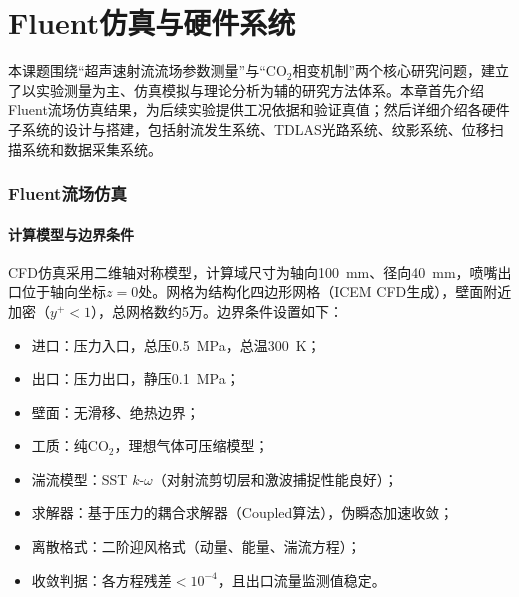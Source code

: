 ﻿\chapter{Fluent仿真与硬件系统}
	本课题围绕“超声速射流流场参数测量”与“CO$_2$相变机制”两个核心研究问题，建立了以实验测量为主、仿真模拟与理论分析为辅的研究方法体系。本章首先介绍Fluent流场仿真结果，为后续实验提供工况依据和验证真值；然后详细介绍各硬件子系统的设计与搭建，包括射流发生系统、TDLAS光路系统、纹影系统、位移扫描系统和数据采集系统。
	\subsection{Fluent流场仿真}
	\subsubsection{计算模型与边界条件}
	CFD仿真采用二维轴对称模型，计算域尺寸为轴向100~mm、径向40~mm，喷嘴出口位于轴向坐标$z=0$处。网格为结构化四边形网格（ICEM CFD生成），壁面附近加密（$y^+<1$），总网格数约5万。边界条件设置如下：
	\begin{itemize}
		\item 进口：压力入口，总压0.5~MPa，总温300~K；
		\item 出口：压力出口，静压0.1~MPa；
		\item 壁面：无滑移、绝热边界；
		\item 工质：纯CO$_2$，理想气体可压缩模型；
		\item 湍流模型：SST $k$-$\omega$（对射流剪切层和激波捕捉性能良好）；
		\item 求解器：基于压力的耦合求解器（Coupled算法），伪瞬态加速收敛；
		\item 离散格式：二阶迎风格式（动量、能量、湍流方程）；
		\item 收敛判据：各方程残差$<10^{-4}$，且出口流量监测值稳定。
	\end{itemize}
